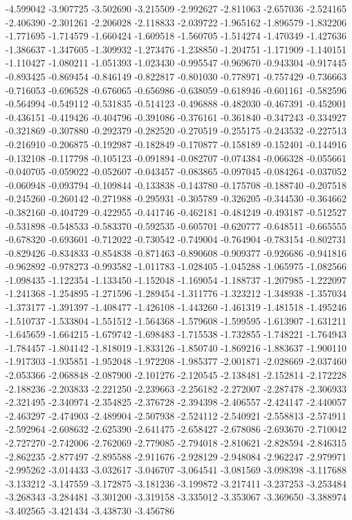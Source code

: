 -4.599042
-3.907725
-3.502690
-3.215509
-2.992627
-2.811063
-2.657036
-2.524165
-2.406390
-2.301261
-2.206028
-2.118833
-2.039722
-1.965162
-1.896579
-1.832206
-1.771695
-1.714579
-1.660424
-1.609518
-1.560705
-1.514274
-1.470349
-1.427636
-1.386637
-1.347605
-1.309932
-1.273476
-1.238850
-1.204751
-1.171909
-1.140151
-1.110427
-1.080211
-1.051393
-1.023430
-0.995547
-0.969670
-0.943304
-0.917445
-0.893425
-0.869454
-0.846149
-0.822817
-0.801030
-0.778971
-0.757429
-0.736663
-0.716053
-0.696528
-0.676065
-0.656986
-0.638059
-0.618946
-0.601161
-0.582596
-0.564994
-0.549112
-0.531835
-0.514123
-0.496888
-0.482030
-0.467391
-0.452001
-0.436151
-0.419426
-0.404796
-0.391086
-0.376161
-0.361840
-0.347243
-0.334927
-0.321869
-0.307880
-0.292379
-0.282520
-0.270519
-0.255175
-0.243532
-0.227513
-0.216910
-0.206875
-0.192987
-0.182849
-0.170877
-0.158189
-0.152401
-0.144916
-0.132108
-0.117798
-0.105123
-0.091894
-0.082707
-0.074384
-0.066328
-0.055661
-0.040705
-0.059022
-0.052607
-0.043457
-0.083865
-0.097045
-0.084264
-0.037052
-0.060948
-0.093794
-0.109844
-0.133838
-0.143780
-0.175708
-0.188740
-0.207518
-0.245260
-0.260142
-0.271988
-0.295931
-0.305789
-0.326205
-0.344530
-0.364662
-0.382160
-0.404729
-0.422955
-0.441746
-0.462181
-0.484249
-0.493187
-0.512527
-0.531898
-0.548533
-0.583370
-0.592535
-0.605701
-0.620777
-0.648511
-0.665555
-0.678320
-0.693601
-0.712022
-0.730542
-0.749004
-0.764904
-0.783154
-0.802731
-0.829426
-0.834833
-0.854838
-0.871463
-0.890608
-0.909377
-0.926686
-0.941816
-0.962892
-0.978273
-0.993582
-1.011783
-1.028405
-1.045288
-1.065975
-1.082566
-1.098435
-1.122354
-1.133450
-1.152048
-1.169054
-1.188737
-1.207985
-1.222097
-1.241368
-1.254895
-1.271596
-1.289454
-1.311776
-1.323212
-1.348938
-1.357034
-1.373177
-1.391397
-1.408477
-1.426108
-1.443260
-1.461319
-1.481518
-1.495246
-1.510737
-1.533804
-1.551512
-1.564368
-1.579608
-1.599595
-1.613907
-1.631211
-1.645659
-1.664215
-1.679742
-1.698483
-1.715538
-1.732855
-1.748221
-1.764943
-1.784457
-1.804142
-1.818019
-1.833126
-1.850740
-1.869216
-1.883637
-1.900110
-1.917303
-1.935851
-1.952048
-1.972208
-1.985377
-2.001871
-2.028669
-2.037460
-2.053366
-2.068848
-2.087900
-2.101276
-2.120545
-2.138481
-2.152814
-2.172228
-2.188236
-2.203833
-2.221250
-2.239663
-2.256182
-2.272007
-2.287478
-2.306933
-2.321495
-2.340974
-2.354825
-2.376728
-2.394398
-2.406557
-2.424147
-2.440057
-2.463297
-2.474903
-2.489904
-2.507938
-2.524112
-2.540921
-2.558813
-2.574911
-2.592964
-2.608632
-2.625390
-2.641475
-2.658427
-2.678086
-2.693670
-2.710042
-2.727270
-2.742006
-2.762069
-2.779085
-2.794018
-2.810621
-2.828594
-2.846315
-2.862235
-2.877497
-2.895588
-2.911676
-2.928129
-2.948084
-2.962247
-2.979971
-2.995262
-3.014433
-3.032617
-3.046707
-3.064541
-3.081569
-3.098398
-3.117688
-3.133212
-3.147559
-3.172875
-3.181236
-3.199872
-3.217411
-3.237253
-3.253484
-3.268343
-3.284481
-3.301200
-3.319158
-3.335012
-3.353067
-3.369650
-3.388974
-3.402565
-3.421434
-3.438730
-3.456786
